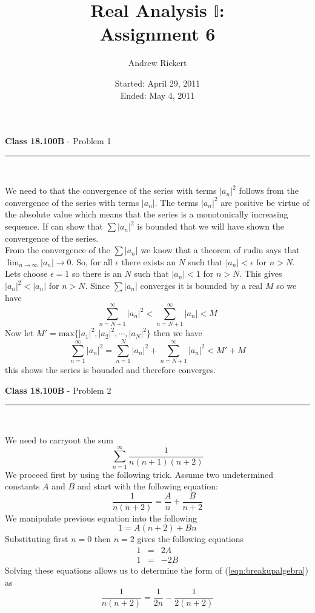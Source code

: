 \documentclass[11pt,reqno]{article}
\title{Real Analysis $\mathbb{I}$: \\ Assignment 6}
\author{Andrew Rickert}
\date{Started: April 29, 2011 \\ \hspace{1pt} Ended: May 4,  2011}                                           %
\begin{document}
\maketitle


\begin{flushleft} 
\textbf{Class 18.100B} - Problem 1\\
\rule{500pt}{1pt}\\
\end{flushleft} 

We need to that the convergence of the series with terms $|a_n|^2$ follows from the convergence of the series with terms $|a_n|$. The terms $|a_n|^2$ are positive be virtue of the absolute value which means that the series is a monotonically increasing sequence. If can show that $\sum |a_n|^2$ is bounded that we will have shown the convergence of the series.\\
\indent From the convergence of the $\sum |a_n|$ we know that a theorem of rudin says that $\lim_{n \to \infty} |a_n| \to 0$. So, for all $\epsilon$ there exists an $N$ such that $|a_n| < \epsilon$ for $n > N$.\\
\indent Lets choose $\epsilon = 1$ so there is an $N$ such that $|a_n| < 1$ for $n > N$. This gives $|a_n|^2 < |a_n|$ for $n > N$. Since $\sum |a_n|$ converges it is bounded by a real $M$ so we have 
\[ \sum_{n = N+1}^\infty |a_n|^2 < \sum_{n = N +1}^\infty |a_n| < M \]
Now let $M' = \text{max} \{ |a_1|^2, |a_2|^2, \cdots, |a_N|^2 \}$ then we have 
\[ \sum_{n = 1}^\infty |a_n|^2 = \sum_{n = 1}^N |a_n|^2 + \sum_{n = N+1}^\infty |a_n|^2 < M' + M \]
this shows the series is bounded and therefore converges.

\vspace{15pt}
\begin{flushleft} 
\textbf{Class 18.100B} - Problem 2\\
\rule{500pt}{1pt}\\
\end{flushleft} 

We need to carryout the sum \[ \sum_{n =1}^\infty \frac{1}{n(n+1)(n+2)} \]
We proceed first by using the following trick. Assume two undetermined constants $A$ and $B$ and start with the following equation:
\begin{equation} 
\frac{1}{n(n+2)} = \frac{A}{n} + \frac{B}{n+2} \label{eqn:breakupalgebra}
\end{equation}
We manipulate previous equation into the following
\[ 1 = A(n+2) + B n \]
Substituting first $n = 0$ then $n = 2$ gives the following equations
\begin{eqnarray*}
1 &=& 2 A \\
1 &=& -2 B 
\end{eqnarray*}
Solving these equations allows us to determine the form of (\ref{eqn:breakupalgebra}) as
\begin{equation}
\frac{1}{n(n+2)} = \frac{1}{2n} - \frac{1}{2(n+2)} \label{eqn:firstbreakup}
\end{equation}
\end{document}
